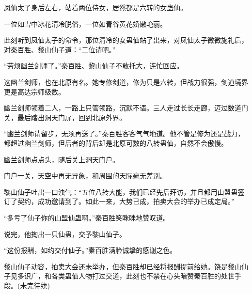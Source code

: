 \begin{this_body}
凤仙太子身后左右，站着两位侍女，居然都是六转的女蛊仙。

一位如雪中冰花清冷脱俗，一位如青谷黄花娇嫩艳丽。

此刻听到凤仙太子的命令，那位清冷的女蛊仙站了出来，对凤仙太子微微施礼后，对秦百胜、黎山仙子道：“二位请吧。”

“劳烦幽兰剑师了。”秦百胜、黎山仙子不敢托大，连忙回应。

这幽兰剑师，也在北原有名。她专修剑道，修为只是六转，但战力很强，剑道境界更是高达宗师级数。

幽兰剑师领着二人，一路上只管领路，沉默不语。三人走过长长走廊，迈过数道门关，最后踏出洞天门扉，回到北原外界。

“幽兰剑师请留步，无须再送了。”秦百胜客客气气地道。他不管是修为还是战力，都超过幽兰剑师，但后者的背后却是北原可数的八转蛊仙，自然不会傲慢。

幽兰剑师点点头，随后关上洞天门户。

门户一关，天空中再无异象，和周围的天际毫无差别。

黎山仙子吐出一口浊气：“五位八转大能，我们已经先后拜访，并且都用山盟蛊签订了契约，成功邀请到了。如此一来，大势已成，拍卖大会的举办已成定局。”

“多亏了仙子你的山盟仙蛊啊。”秦百胜笑眯眯地赞叹道。

说完，他掏出一只仙蛊，交予黎山仙子。

“这份报酬，如约交付仙子。”秦百胜满脸诚挚的感谢之色。

黎山仙子动容，拍卖大会还未举办，但秦百胜却已经将报酬提前给她。饶是黎山仙子见多识广，和各类蛊仙人物打过交道，此刻也不禁在心头暗赞秦百胜的处世手段。(未完待续)

\end{this_body}

